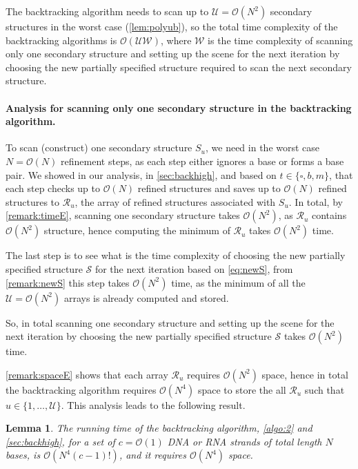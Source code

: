 \documentclass[11pt,letterpaper]{article}  \usepackage[margin=1in]{geometry}
\newtheorem{lemma}[theorem]{Lemma}
\theoremstyle{definition}  \newtheorem{Definition}[theorem]{Definition}
\begin{document}
The backtracking algorithm needs to scan up to $\mathcal{U} = \mathcal{O}(N^2)$ secondary structures in the worst case ({\cref{lem:polyub}}), so the total time complexity of the backtracking algorithms is $\mathcal{O}(\mathcal{U} \mathcal{W})$, where $\mathcal{W}$ is the time complexity of scanning only one secondary structure and setting up the scene for the next iteration by choosing the new partially specified structure required to scan the next secondary structure. 

\paragraph{Analysis for scanning only one secondary structure in the backtracking algorithm.}
To scan (construct) one secondary structure $S_u$, we need in the worst case  $N = \mathcal{O}(N)$ refinement steps, as each step either ignores a base or forms a base pair. We showed in our analysis, in \cref{sec:backhigh}, and based on $t \in \{\square,b,m\}$, that each step checks up to $\mathcal{O}(N)$ refined structures and saves up to $\mathcal{O}(N)$ refined structures to $\mathcal{R}_u$, the array of refined structures associated with $S_u$. In total, by \cref{remark:timeE}, scanning one secondary structure takes $\mathcal{O}(N^2)$, as $\mathcal{R}_u$ contains $\mathcal{O}(N^2)$ structure, hence computing the minimum of $\mathcal{R}_u$ takes $\mathcal{O}(N^2)$ time. 

The last step is to see what is the time complexity of choosing the new partially specified structure $\mathcal{S}$ for the next iteration based on \cref{eq:newS}, from \cref{remark:newS} this step takes $\mathcal{O}(N^2)$ time, as the minimum of all the $\mathcal{U} = \mathcal{O}(N^2)$ arrays is already computed and stored. 

So, in total scanning one secondary structure and setting up the scene for the next iteration by choosing the new partially specified structure $\mathcal{S}$ takes $\mathcal{O}(N^2)$ time.

\cref{remark:spaceE} shows that each array $\mathcal{R}_u$ requires $\mathcal{O}(N^2)$ space, hence in total the backtracking algorithm requires $\mathcal{O}(N^4)$ space to store the all $\mathcal{R}_u$ such that $u \in \{1, \ldots, \mathcal{U}\}$. This analysis leads to the following result.

\begin{lemma}\label{lem:BTtime}
	The running time  of the backtracking algorithm,   \cref{algo:2} and \cref{sec:backhigh},
	for a set of $c = \mathcal{O}(1)$ DNA or RNA strands of total length  $N$ bases, is $\mathcal{O}(N^4(c-1)!)$, and it requires $\mathcal{O}(N^4)$ space.  
\end{lemma}
\end{document}
